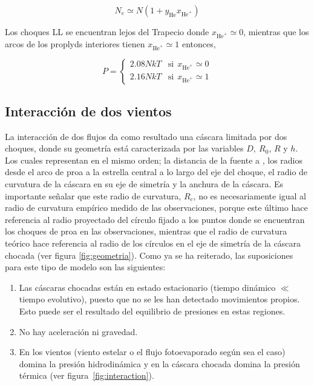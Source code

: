 \begin{equation*}
  \label{eq:density}
  N_{e} \simeq N(1 +  y_{\text{He}}x_{\text{He}^{+}})
\end{equation*}

 Los choques LL se encuentran lejos del Trapecio donde \(x_{\text{He}^{+}} \simeq 0\), mientras que los arcos de los proplyds interiores tienen \(x_{\text{He}^{+}} \simeq 1\)  entonces,

\begin{equation}
  \label{eq:pressure}
  P =  \left\{ \begin{array}{ll}
  2.08 N k T  & \mathrm{si} ~~ \mbox{$x_{\text{He}^{+}} \simeq 0$}\\
  2.16 N k T  & \mathrm{si} ~~ \mbox{$x_{\text{He}^{+}} \simeq 1$}
 \end{array}
 \right.
\end{equation}

\subsection{Interacción de dos vientos}
\label{sec:interaction}

La interacción de dos flujos da como resultado una cáscara limitada por dos choques, donde su geometría está caracterizada por las variables \(D,~R_{0}\), \(R\) y \(h\). Los cuales representan en el mismo orden; la distancia de la fuente a \thC{}, los radios desde el arco de proa a la estrella central a lo largo del eje del choque, el radio de curvatura de la cáscara en su eje de simetría y la anchura de la cáscara. Es importante señalar que este radio de curvatura, \(R_{c}\), no es necesariamente igual al radio de curvatura empírico medido de las observaciones, porque este último hace referencia al radio proyectado del círculo fijado a los puntos donde se encuentran los choques de proa en las observaciones, mientras que el radio de curvatura teórico hace referencia al radio de los círculos en el eje de simetría de la cáscara chocada (ver figura \ref{fig:geometria}). Como ya se ha reiterado, las suposiciones para este tipo de modelo son las siguientes:
\begin{enumerate}
\item Las cáscaras chocadas están en estado estacionario (tiempo dinámico \(\ll\) tiempo evolutivo), puesto que no se les han detectado movimientos propios. Esto puede ser el resultado del equilibrio de presiones en estas regiones.
\item No hay aceleración ni gravedad.
\item En los vientos (viento estelar o el flujo fotoevaporado según sea el caso) domina la presión hidrodinámica y en la cáscara chocada domina la presión térmica (ver figura~\ref{fig:interaction}).  
\end{enumerate}

